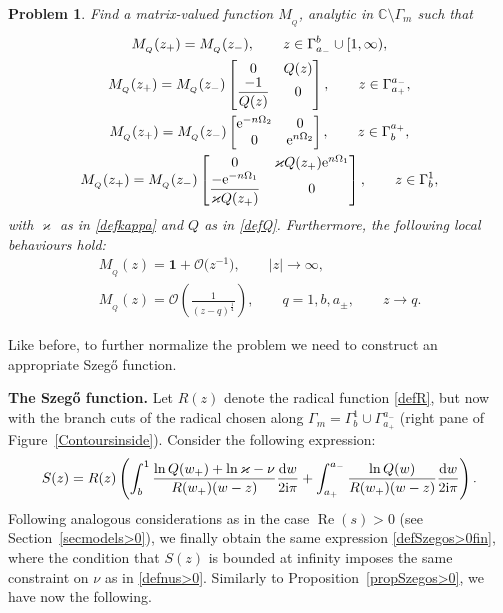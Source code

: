 \documentclass[pdftex]{sigma}
\numberwithin{equation}{section}
\newtheorem{problem}[Theorem]{Problem}
\theoremstyle{definition}
\def\le{\left}
\def\ri{\right}
\def \d{{\mathrm d}}
\def\nn{\nonumber}
\def\be{\begin{equation}}
\def\ee{\end{equation}}
\def \1{\mathbf 1}
\def\C{{\mathbb C}}
\def \Re{\operatorname{Re} }
\begin{document}
\begin{problem}\label{RHPMQs<0}
Find a matrix-valued function $M_{_Q}$, analytic in $\C\setminus \Gamma_m$ such that
\begin{gather*}%
M_{_Q}(z_+) = M_{_Q}(z_-), \qquad z\in \Gamma_{a_-}^b\cup [1,\infty),\nn\\
M_{_Q}(z_+)= M_{_Q}(z_-) \begin{bmatrix}
0 & Q(z) \\
\displaystyle \frac{-1}{Q(z)} & 0
\end{bmatrix}, \qquad z\in \Gamma_{a_+}^{a_-},
\\
M_{_Q}(z_+)= M_{_Q}(z_-) \begin{bmatrix}
 {\rm e}^{-n\Omega_2} & 0\\
 0 & {\rm e}^{n\Omega_2}
\end{bmatrix},\qquad z\in \Gamma_b^{a_+},
\\
M_{_Q}(z_+)= M_{_Q}(z_-) \begin{bmatrix}
0 & \varkappa Q(z_+) {\rm e}^{n\Omega_1}\\
\displaystyle \frac{-{\rm e}^{-n\Omega_1}}{\varkappa Q(z_+)} & 0
\end{bmatrix}, \qquad z\in \Gamma_b^{1},
\end{gather*}
with $\varkappa$ as in \eqref{defkappa} and $Q$ as in \eqref{defQ}.
Furthermore, the following local behaviours hold:
\begin{gather*}
M_{_Q}(z) = \1 + \mathcal O\bigl(z^{-1}\bigr), \qquad |z|\to \infty,\\
M_{_Q}(z)= \mathcal O\le(\frac 1 {(z-q)^\frac 1 4}\ri), \qquad q= 1,b,a_\pm, \qquad z\to q.
\end{gather*}
\end{problem}

Like before, to further normalize the problem we need to construct an appropriate Szeg\H{o} function.

{\bf The Szeg\H{o} function.}
Let $R(z)$ denote the radical function \eqref{defR}, but now with the branch cuts of the radical chosen along $\Gamma_m = \Gamma_b^1\cup \Gamma_{a_+}^{a_-}$ (right pane of Figure~\ref{Contoursinside}).
Consider the following expression:
\be
\label{defSzegos<0}
S(z) = R(z) \le(
\int_b^1\frac{\ln Q(w_+) + \ln \varkappa-\nu}{R(w_+)(w-z)} \frac{\d w}{2{\rm i}\pi}
+
\int_{a_+}^{a_-}\frac{\ln Q(w)}{R(w_+)(w-z)} \frac{\d w}{2{\rm i}\pi}
 \ri).
\ee
Following analogous considerations as in the case $\Re (s)>0$ (see Section~\ref{secmodels>0}), we finally obtain the same expression \eqref{defSzegos>0fin},
where the condition that $S(z)$ is bounded at infinity imposes the same constraint on $\nu$ as in \eqref{defnus>0}.
Similarly to Proposition~\ref{propSzegos>0}, we have now the following.
\end{document}
